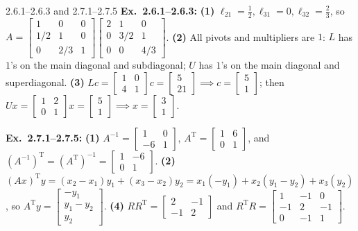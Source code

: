 \documentclass[11pt,a4paper,openany,oneside]{book}
\def\vect#1{#1}%
\def\mathbf#1{#1}%
\newcommand{\vect}[1]{\mathbf{#1}}
\newcommand{\T}{\mathrm{T}}
\numberwithin{equation}{chapter}
\begin{document}
\vfill
\begin{pageend_sol}{2.6.1--2.6.3 and 2.7.1--2.7.5}
\textbf{Ex.\ 2.6.1--2.6.3:} \textbf{(1)} $\ell_{21}=\frac{1}{2}, \ell_{31}=0, \ell_{32}=\frac{2}{3}$, so $A = \begin{bmatrix}1&0&0\\1/2&1&0\\0&2/3&1\end{bmatrix}\begin{bmatrix}2&1&0\\0&3/2&1\\0&0&4/3\end{bmatrix}$. \textbf{(2)} All pivots and multipliers are $1$: $L$ has $1$'s on the main diagonal and subdiagonal; $U$ has $1$'s on the main diagonal and superdiagonal. \textbf{(3)} $L\vect{c} = \begin{bmatrix}1&0\\4&1\end{bmatrix}\vect{c} = \begin{bmatrix}5\\21\end{bmatrix} \implies \vect{c} = \begin{bmatrix}5\\1\end{bmatrix}$; then $U\vect{x} = \begin{bmatrix}1&2\\0&1\end{bmatrix}\vect{x} = \begin{bmatrix}5\\1\end{bmatrix} \implies \vect{x} = \begin{bmatrix}3\\1\end{bmatrix}$.

\textbf{Ex.\ 2.7.1--2.7.5:} \textbf{(1)} $A^{-1} = \begin{bmatrix}1 & 0\\-6 & 1\end{bmatrix}$, $A^\T = \begin{bmatrix}1 & 6\\0 & 1\end{bmatrix}$, and $(A^{-1})^\T = (A^\T)^{-1} = \begin{bmatrix}1 & -6\\0 & 1\end{bmatrix}$. \textbf{(2)} $(A\vect{x})^\T\vect{y} = (x_2-x_1)y_1 + (x_3-x_2)y_2 = x_1(-y_1) + x_2(y_1-y_2) + x_3(y_2)$, so $A^\T\vect{y} = \begin{bmatrix}-y_1\\y_1-y_2\\y_2\end{bmatrix}$. \textbf{(4)} $RR^\T = \begin{bmatrix}2 & -1\\-1 & 2\end{bmatrix}$ and $R^\T R = \begin{bmatrix}1 & -1 & 0\\-1 & 2 & -1\\0 & -1 & 1\end{bmatrix}$.
\end{pageend_sol}
\clearpage
\end{document}
